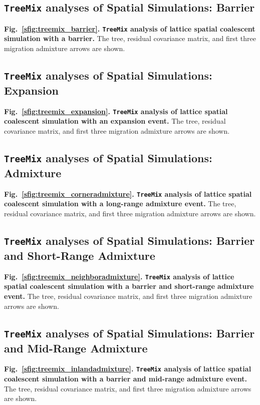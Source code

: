 \documentclass[10pt,letterpaper]{article}
\begin{document}
\subsection*{\texttt{TreeMix} analyses of Spatial Simulations: Barrier}
\label{treemix_barrier}
{\bf{Fig.\ \ref{sfig:treemix_barrier}. \texttt{TreeMix} analysis of lattice spatial coalescent simulation with a barrier.}}
The tree, residual covariance matrix, and first three migration admixture arrows are shown.

\subsection*{\texttt{TreeMix} analyses of Spatial Simulations: Expansion}
\label{treemix_expansion}
{\bf{Fig.\ \ref{sfig:treemix_expansion}. \texttt{TreeMix} analysis of lattice spatial coalescent simulation with an expansion event.}}
The tree, residual covariance matrix, and first three migration admixture arrows are shown.

\subsection*{\texttt{TreeMix} analyses of Spatial Simulations: Admixture}
\label{treemix_corneradmixture}
{\bf{Fig.\ \ref{sfig:treemix_corneradmixture}. \texttt{TreeMix} analysis of lattice spatial coalescent simulation with a long-range admixture event.}}
The tree, residual covariance matrix, and first three migration admixture arrows are shown.

\subsection*{\texttt{TreeMix} analyses of Spatial Simulations: Barrier and Short-Range Admixture}
\label{treemix_neighboradmixture}
{\bf{Fig.\ \ref{sfig:treemix_neighboradmixture}. \texttt{TreeMix} analysis of lattice spatial coalescent simulation with a barrier and short-range admixture event.}}  
The tree, residual covariance matrix, and first three migration admixture arrows are shown.

\subsection*{\texttt{TreeMix} analyses of Spatial Simulations: Barrier and Mid-Range Admixture}
\label{treemix_inlandadmixture}
{\bf{Fig.\ \ref{sfig:treemix_inlandadmixture}. \texttt{TreeMix} analysis of lattice spatial coalescent simulation with a barrier and mid-range admixture event.}}  
The tree, residual covariance matrix, and first three migration admixture arrows are shown.
\end{document}
